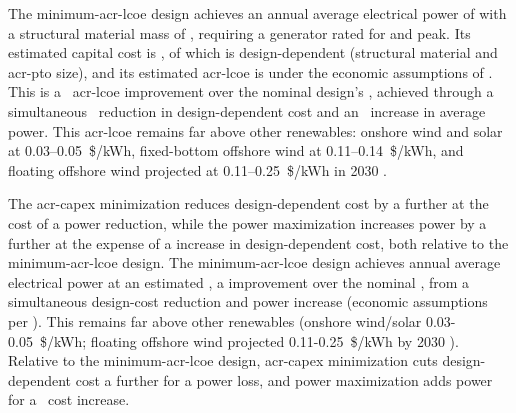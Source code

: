\ifdefined\DISSERTATION
    The minimum-\gls{acr-lcoe} design achieves an annual average electrical power of \resultsRE[powerAvgAtMinLCOE]
    with a structural material mass of \resultsRE[structMassAtMinLCOE],
    requiring a generator rated for \resultsRE[powerMaxAtMinLCOE] and \resultsRE[forceMaxAtMinLCOE] peak.
    Its estimated capital cost is \resultsRE[capexAtMinLCOE],
    of which \resultsRE[capexDesignAtMinLCOE] is design-dependent (structural material and \gls{acr-pto} size),
    and its estimated \gls{acr-lcoe} is \resultsRE[minLCOE] under the economic assumptions of \citet{mccabe_development_2026}.
    This is a \resultsRE[pctImproveLCOEMinLCOE]~\gls{acr-lcoe} improvement over the nominal design's \resultsRE[nominalLCOE],
    achieved through a simultaneous \resultsRE[pctImproveDesignCostMinLCOE]~reduction in design-dependent cost
    and an \resultsRE[pctImprovePowerMinLCOE]~increase in average power.
    This \gls{acr-lcoe} remains far above other renewables:
    onshore wind and solar at 0.03--0.05~\$/kWh,
    fixed-bottom offshore wind at 0.11--0.14~\$/kWh,
    and floating offshore wind projected at 0.11--0.25~\$/kWh in 2030
    \citep{national_renewable_energy_laboratory_2024_2024}.
    
    The \gls{acr-capex} minimization reduces design-dependent cost by a further \resultsRE[pctImproveDesignCostMinCapex] at the cost of a \resultsRE[pctWorsePowerMinCapex] power reduction,
    while the power maximization increases power by a further \resultsRE[pctImprovePowerMaxPower] at the expense of a \resultsRE[pctWorseDesignCostMaxPower] increase in design-dependent cost,
    both relative to the minimum-\gls{acr-lcoe} design.
\else
    The minimum-\gls{acr-lcoe} design achieves \resultsRE[powerAvgAtMinLCOE] annual average electrical power at an estimated \resultsRE[minLCOE],
    a \resultsRE[pctImproveLCOEMinLCOE] improvement over the nominal \resultsRE[nominalLCOE],
    from a simultaneous \resultsRE[pctImproveDesignCostMinLCOE] design-cost reduction and
    \resultsRE[pctImprovePowerMinLCOE] power increase (economic assumptions per \citet{mccabe_development_2026}).
    This remains far above other renewables (onshore wind/solar 0.03-0.05~\$/kWh; floating offshore wind projected 0.11-0.25~\$/kWh by 2030 \citep{national_renewable_energy_laboratory_2024_2024}).
    Relative to the minimum-\gls{acr-lcoe} design,
    \gls{acr-capex} minimization cuts design-dependent cost a further \resultsRE[pctImproveDesignCostMinCapex]
    for a \resultsRE[pctWorsePowerMinCapex] power loss,
    and power maximization adds \resultsRE[pctImprovePowerMaxPower] power
    for a \resultsRE[pctWorseDesignCostMaxPower]~cost increase.
\fi

